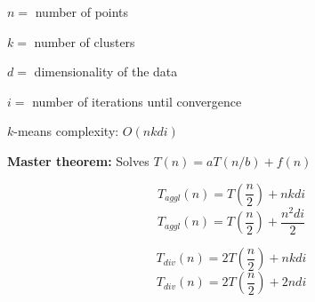\documentclass{article}
\begin{document}
$n=$ number of points

$k=$ number of clusters

$d=$ dimensionality of the data

$i=$ number of iterations until convergence

$k$-means complexity: $O(nkdi)$

\textbf{Master theorem: } Solves $T(n) = aT(n/b) + f(n)$

$$T_{aggl}(n) = T(\frac{n}{2}) + nkdi$$
$$T_{aggl}(n) = T(\frac{n}{2}) + \frac{n^2di}{2}$$


$$T_{div}(n) = 2T(\frac{n}{2}) + nkdi$$
$$T_{div}(n) = 2T(\frac{n}{2}) + 2ndi$$
\end{document}
